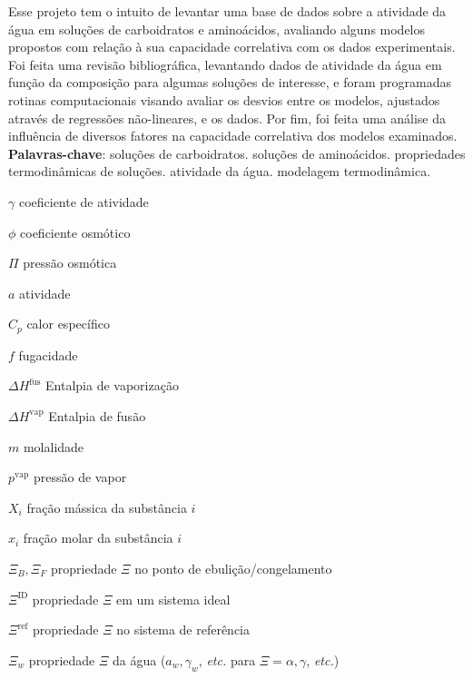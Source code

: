 \documentclass[
	12pt,				%
	openright,
	twoside,
	a4paper,			%
	english,			%
	french,				%
	spanish,			%
	brazil				%
	]{abntex2}
\begin{document}

\frenchspacing

\imprimircapa

\imprimirfolhaderosto


\setlength{\absparsep}{18pt}
\begin{resumo}
	Esse projeto tem o intuito de levantar uma base de dados sobre a
	atividade da água em soluções de carboidratos e aminoácidos,
	avaliando alguns modelos propostos com relação à sua capacidade
	correlativa com os dados experimentais. Foi feita uma revisão
	bibliográfica, levantando dados de atividade da água em função da
	composição para algumas soluções de interesse, e foram programadas
	rotinas computacionais visando avaliar os desvios entre os modelos,
	ajustados através de regressões não-lineares, e os dados. Por fim,
	foi feita uma análise da influência de diversos fatores na capacidade
	correlativa dos modelos examinados.\\
	\textbf{Palavras-chave}: soluções de carboidratos.
			soluções de aminoácidos.
			propriedades termodinâmicas de soluções.
			atividade da água.
			modelagem termodinâmica.
\end{resumo}

\listoffigures*
\cleardoublepage


\listoftables*
\cleardoublepage

\begin{simbolos}
	\item[$ \gamma $] coeficiente de atividade
	\item[$ \phi $] coeficiente osmótico
	\item[$ \Pi $] pressão osmótica
	\item[$ a $] atividade
	\item[$ C_p $] calor específico
	\item[$ f $] fugacidade
	\item[$ \Delta H^\text{fus} $] Entalpia de vaporização
	\item[$ \Delta H^\text{vap} $] Entalpia de fusão
	\item[$ m $] molalidade
	\item[$ p^\text{vap} $] pressão de vapor
	\item[$ X_i $] fração mássica da substância $i$
	\item[$ x_i $] fração molar da substância $i$
	\item[$ \Xi_B, \Xi_F $] propriedade $\Xi$ no ponto de ebulição/congelamento
	\item[$ \Xi^\text{ID} $] propriedade $\Xi$ em um sistema ideal
	\item[$ \Xi^\text{ref} $] propriedade $\Xi$ no sistema de referência
	\item[$ \Xi_w $] propriedade $\Xi$ da água ($a_w, \gamma_w$, \textit{etc.} para $\Xi = \alpha, \gamma$, \textit{etc.})
\end{simbolos}
\end{document}
